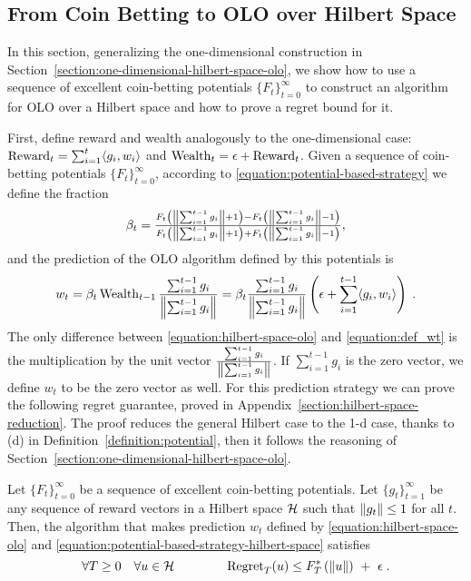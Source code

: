 \subsection{From Coin Betting to OLO over Hilbert Space}
\label{section:reduction_hilbert}

In this section, generalizing the one-dimensional construction in
Section~\ref{section:one-dimensional-hilbert-space-olo}, we show how to use a
sequence of excellent coin-betting potentials $\{F_t\}_{t=0}^\infty$ to
construct an algorithm for \ac{OLO} over a Hilbert space and how to prove a
regret bound for it.

First, define reward and wealth analogously to the one-dimensional case:
$\operatorname{Reward}_t = \sum_{i=1}^t \langle g_i, w_i \rangle$ and $\operatorname{Wealth}_t = \epsilon +
\operatorname{Reward}_t$.
Given a sequence of coin-betting potentials $\{F_t\}_{t=0}^\infty$, according
to \eqref{equation:potential-based-strategy} we define the fraction
\begin{equation}
\label{equation:potential-based-strategy-hilbert-space}
\beta_t
= \tfrac{F_t \left(\left\|{\sum_{i=1}^{t-1} g_i}\right\| + 1\right) - F_t\left(\left\|{\sum_{i=1}^{t-1} g_i}\right\| - 1 \right)}{F_t\left(\left\|{\sum_{i=1}^{t-1} g_i}\right\| + 1 \right) + F_t\left(\left\|{\sum_{i=1}^{t-1} g_i}\right\| - 1 \right)},
\end{equation}
and the prediction of the OLO algorithm
defined by this potentials is
\begin{equation}
\label{equation:hilbert-space-olo}
w_t
= \beta_t \operatorname{Wealth}_{t-1} \frac{\sum_{i=1}^{t-1} g_i}{\left\|{\sum_{i=1}^{t-1} g_i}\right\|}
= \beta_t \frac{\sum_{i=1}^{t-1} g_i}{\left\|{\sum_{i=1}^{t-1} g_i}\right\|} \left(\epsilon+ \sum_{i=1}^{t-1} \langle g_i, w_i\rangle \right) \; .
\end{equation}
\vspace{-0.01cm}
The only difference between \eqref{equation:hilbert-space-olo} and
\eqref{equation:def_wt} is the multiplication by the unit vector
$\tfrac{\sum_{i=1}^{t-1} g_i}{\left\|{\sum_{i=1}^{t-1} g_i}\right\|}$. If
$\sum_{i=1}^{t-1} g_i$ is the zero vector, we define $w_t$ to be the zero
vector as well.  For this prediction strategy we can prove the following regret
guarantee, proved in Appendix~\ref{section:hilbert-space-reduction}.  The proof
reduces the general Hilbert case to the 1-d case, thanks to (d) in
Definition~\ref{definition:potential}, then it follows the reasoning of
Section~\ref{section:one-dimensional-hilbert-space-olo}.
%
\begin{theorem}
\label{theorem:hilbert-space-olo-regret-bound}
Let $\{F_t\}_{t=0}^\infty$ be a sequence of excellent coin-betting potentials.
Let $\{g_t\}_{t=1}^\infty$ be any sequence of reward vectors in a Hilbert space
$\mathcal{H}$ such that $\left\|{g_t}\right\| \le 1$ for all $t$. Then, the algorithm that makes
prediction $w_t$ defined by \eqref{equation:hilbert-space-olo} and
\eqref{equation:potential-based-strategy-hilbert-space} satisfies
\[
\forall T \ge 0 \quad
\forall u \in \mathcal{H} \qquad \qquad
\operatorname{Regret}_T(u) \le F_T^*\left(\left\|{u}\right\| \right) \ + \ \epsilon \; .
\]
\end{theorem}
